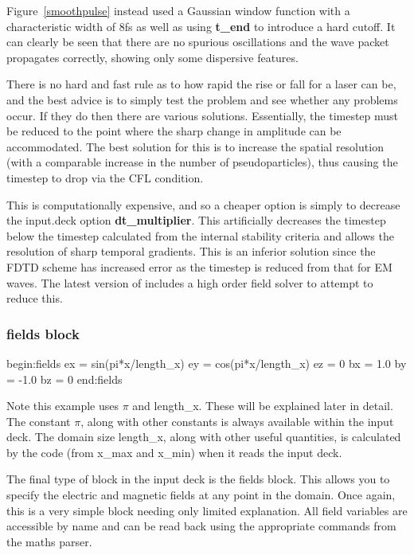 \documentclass[12pt,a4paper]{article}
\newcommand{\inlineemph}[1]{{\color{warwicklight} \bf{#1}}}
\newcommand{\EPOCH}{{\color{warwickdark}\fontfamily{phv}\selectfont{EPOCH}}}
\newenvironment{lboxverbatim}[1]{
\setlength{\FrameSep}{0pt}
\def\FrameCommand{\fboxsep=0pt \colorbox{shadecolor}}
\MakeFramed{\FrameRestore}
\vspace{-13.5pt}
\fvset{label=#1}
\boxverb
}{
\endboxverb
\vspace{-13.5pt}
\endMakeFramed
}
\begin{document}
Figure~\ref{smoothpulse} instead used a Gaussian window function with a
characteristic width of 8fs as well as using \inlineemph{t\_end} to introduce
a hard cutoff. It can clearly be seen that there are no spurious oscillations
and the wave packet propagates correctly, showing only some dispersive
features.

There is no hard and fast rule as to how rapid the rise or fall for a laser can
be, and the best advice is to simply test the problem and see whether any
problems occur. If they do then there are various solutions. Essentially, the
timestep must be reduced to the point where the sharp change in amplitude can
be accommodated. The best solution for this is to increase the spatial
resolution (with a comparable increase in the number of pseudoparticles), thus
causing the timestep to drop via the CFL condition.

This is computationally expensive, and so a cheaper option is simply to
decrease the input.deck option \inlineemph{dt\_multiplier}. This artificially
decreases the timestep below the timestep calculated from the internal
stability criteria and allows the resolution of sharp temporal gradients. This
is an inferior solution since the FDTD scheme has increased error as the
timestep is reduced from that for EM waves. The latest version of {\EPOCH}
includes a high order field solver to attempt to reduce this.

\subsubsection{\inlineemph{fields} block}
\begin{lboxverbatim}{fields block}
begin:fields
   ex = sin(pi*x/length_x)
   ey = cos(pi*x/length_x)
   ez = 0
   bx = 1.0
   by = -1.0
   bz = 0
end:fields
\end{lboxverbatim}

Note this example uses $\pi$ and length\_x. These will be explained later in
detail. The constant $\pi$, along with other constants is always available
within the input deck. The domain size length\_x, along with other useful
quantities, is calculated by the code (from x\_max and x\_min)
when it reads the input deck.

The final type of block in the {\EPOCH} input deck is the fields block. This
allows you to specify the electric and magnetic fields at any point in the
domain. Once again, this is a very simple block needing only limited
explanation. All field variables are accessible by name and can be read back
using the appropriate commands from the maths parser. \\
\end{document}
